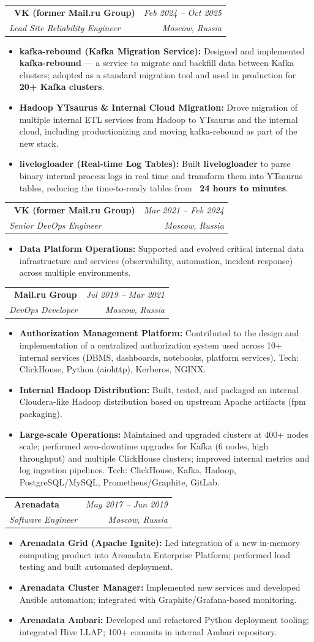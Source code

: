 \documentclass[letterpaper,10pt]{article}
\makeatletter
\newcommand{\resumeItem}[2]{
  \item\small{\textbf{#1:} #2\vspace{-2pt}}
}
\newcommand{\resumeSubItem}[2]{\resumeItem{#1}{#2}}
\newcommand{\expSubheading}[4]{
  \item
    \begin{tabular*}{\textwidth}{l@{\extracolsep{\fill}}r}
      \textbf{\textbullet\ #1} & \textit{\small #4} \\
      \textit{#2} & \textit{\small #3} \\
    \end{tabular*}
    \vspace{0.5pt}
}
\newcommand{\resumeItemListStart}{\begin{itemize}[leftmargin=0.18in, itemsep=1pt, topsep=0pt, parsep=0pt, partopsep=0pt]}
\newcommand{\resumeItemListEnd}{\end{itemize}\vspace{-3pt}}
\makeatother
\begin{document}
  \expSubheading
    {VK (former Mail.ru Group)}{Lead Site Reliability Engineer}{Moscow, Russia}{Feb 2024 -- Oct 2025}
    \resumeItemListStart
      \resumeSubItem{kafka-rebound (Kafka Migration Service)}{Designed and implemented \textbf{kafka-rebound} --- a service to migrate and backfill data between Kafka clusters; adopted as a standard migration tool and used in production for \textbf{20+ Kafka clusters}.}
      \resumeSubItem{Hadoop \textrightarrow{} YTsaurus \& Internal Cloud Migration}{Drove migration of multiple internal ETL services from Hadoop to YTsaurus and the internal cloud, including productionizing and moving kafka-rebound as part of the new stack.}
      \resumeSubItem{livelogloader (Real-time Log \textrightarrow{} Tables)}{Built \textbf{livelogloader} to parse binary internal process logs in real time and transform them into YTsaurus tables, reducing the time-to-ready tables from \textbf{~24 hours to minutes}.}
    \resumeItemListEnd

  \expSubheading
    {VK (former Mail.ru Group)}{Senior DevOps Engineer}{Moscow, Russia}{Mar 2021 -- Feb 2024}
    \resumeItemListStart
      \resumeSubItem{Data Platform Operations}{Supported and evolved critical internal data infrastructure and services (observability, automation, incident response) across multiple environments.}
    \resumeItemListEnd

  \expSubheading
    {Mail.ru Group}{DevOps Developer}{Moscow, Russia}{Jul 2019 -- Mar 2021}
    \resumeItemListStart
      \resumeSubItem{Authorization Management Platform}{Contributed to the design and implementation of a centralized authorization system used across 10+ internal services (DBMS, dashboards, notebooks, platform services). Tech: ClickHouse, Python (aiohttp), Kerberos, NGINX.}
      \resumeSubItem{Internal Hadoop Distribution}{Built, tested, and packaged an internal Cloudera-like Hadoop distribution based on upstream Apache artifacts (fpm packaging).}
      \resumeSubItem{Large-scale Operations}{Maintained and upgraded clusters at 400+ nodes scale; performed zero-downtime upgrades for Kafka (6 nodes, high throughput) and multiple ClickHouse clusters; improved internal metrics and log ingestion pipelines. Tech: ClickHouse, Kafka, Hadoop, PostgreSQL/MySQL, Prometheus/Graphite, GitLab.}
    \resumeItemListEnd

  \expSubheading
    {Arenadata}{Software Engineer}{Moscow, Russia}{May 2017 -- Jun 2019}
    \resumeItemListStart
      \resumeSubItem{Arenadata Grid (Apache Ignite)}{Led integration of a new in-memory computing product into Arenadata Enterprise Platform; performed load testing and built automated deployment.}
      \resumeSubItem{Arenadata Cluster Manager}{Implemented new services and developed Ansible automation; integrated with Graphite/Grafana-based monitoring.}
      \resumeSubItem{Arenadata Ambari}{Developed and refactored Python deployment tooling; integrated Hive LLAP; 100+ commits in internal Ambari repository.}
    \resumeItemListEnd
\end{document}
